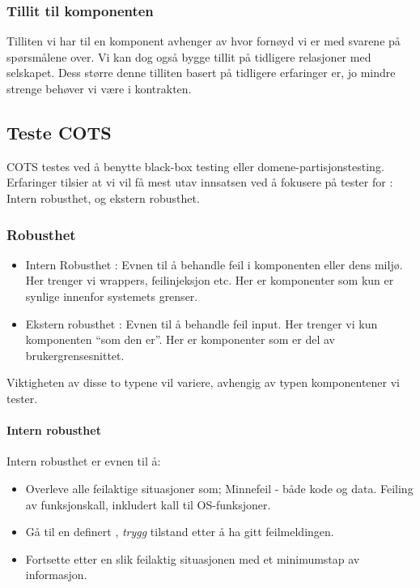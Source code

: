 \subsubsection{Tillit til komponenten}

Tilliten vi har til en komponent avhenger av hvor fornøyd vi er med
svarene på spørsmålene over. Vi kan dog også bygge tillit på tidligere
relasjoner med selskapet. Dess større denne tilliten basert på tidligere
erfaringer er, jo mindre strenge behøver vi være i kontrakten.

\subsection{Teste COTS}

COTS testes ved å benytte black-box testing eller
domene-partisjonstesting. Erfaringer tilsier at vi vil få mest utav
innsatsen ved å fokusere på tester for : Intern robusthet, og ekstern
robusthet.

\subsubsection{Robusthet}

\begin{itemize}
\item
  Intern Robusthet : Evnen til å behandle feil i komponenten eller dens
  miljø. Her trenger vi wrappers, feilinjeksjon etc. Her er komponenter
  som kun er synlige innenfor systemets grenser.
\item
  Ekstern robusthet : Evnen til å behandle feil input. Her trenger vi
  kun komponenten ``som den er''. Her er komponenter som er del av
  brukergrensesnittet.
\end{itemize}
Viktigheten av disse to typene vil variere, avhengig av typen
komponentener vi tester.

\paragraph{Intern robusthet}

Intern robusthet er evnen til å:

\begin{itemize}
\item
  Overleve alle feilaktige situasjoner som; Minnefeil - både kode og
  data. Feiling av funksjonskall, inkludert kall til OS-funksjoner.
\item
  Gå til en definert , \emph{trygg} tilstand etter å ha gitt
  feilmeldingen.
\item
  Fortsette etter en slik feilaktig situasjonen med et minimumstap av
  informasjon.
\end{itemize}
